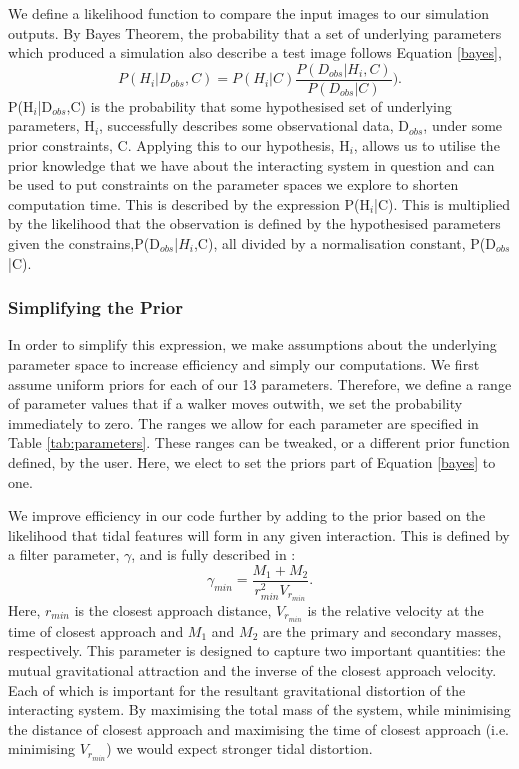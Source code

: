 We define a likelihood function to compare the input images to our simulation outputs. By Bayes Theorem, the probability that a set of underlying parameters which produced a simulation also describe a test image follows Equation \ref{bayes},
\begin{equation}\label{bayes}
    P(H_{i}|D_{obs},C) = P(H_{i}|C)\frac{P(D_{obs}|H_{i},C)}{P(D_{obs}|C)}).
\end{equation}
P(H$_{i}$|D$_{obs}$,C) is the probability that some hypothesised set of underlying parameters, H$_{i}$, successfully describes some observational data, D$_{obs}$, under some prior constraints, C. Applying this to our hypothesis, H$_{i}$, allows us to utilise the prior knowledge that we have about the interacting system in question and can be used to put constraints on the parameter spaces we explore to shorten computation time. This is described by the expression P(H$_{i}$|C). This is multiplied by the likelihood that the observation is defined by the hypothesised parameters given the constrains,P(D$_{obs}$|$H_{i}$,C), all divided by a normalisation constant, P(D$_{obs}$|C).

\subsubsection{Simplifying the Prior}
In order to simplify this expression, we make assumptions about the underlying parameter space to increase efficiency and simply our computations. We first assume uniform priors for each of our 13 parameters. Therefore, we define a range of parameter values that if a walker moves outwith, we set the probability immediately to zero. The ranges we allow for each parameter are specified in Table \ref{tab:parameters}. These ranges can be tweaked, or a different prior function defined, by the user. Here, we elect to set the priors part of Equation \ref{bayes} to one.

We improve efficiency in our code further by adding to the prior based on the likelihood that tidal features will form in any given interaction. This is defined by a filter parameter, $\gamma$, and is fully described in \citet[][where it is called $\beta$ but we call it $\gamma$ here to not be confused with our star formation enhancement parameter of Equation \ref{enhancement_param}]{2016MNRAS.459..720H}:
\begin{equation}\label{gamma_param}
    \gamma_{min} = \frac{M_{1} + M_{2}}{r_{min}^{2}V_{r_{min}}}.
\end{equation}
Here, $r_{min}$ is the closest approach distance, $V_{r_{min}}$ is the relative velocity at the time of closest approach and $M_{1}$ and $M_{2}$ are the primary and secondary masses, respectively. This parameter is designed to capture two important quantities: the mutual gravitational attraction and the inverse of the closest approach velocity. Each of which is important for the resultant gravitational distortion of the interacting system. By maximising the total mass of the system, while minimising the distance of closest approach and maximising the time of closest approach (i.e. minimising $V_{r_{min}}$) we would expect stronger tidal distortion. 

